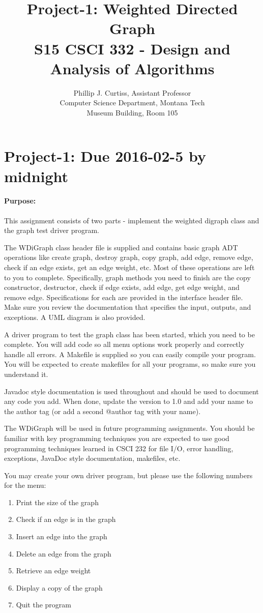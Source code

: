 \documentclass[10pt,letterpaper]{article}
\title{Project-1: Weighted Directed Graph\\
	   S15 CSCI 332 - Design and Analysis of Algorithms}
\author{Phillip J. Curtiss, Assistant Professor\\
	    Computer Science Department, Montana Tech\\
		Museum Building, Room 105}
\newcounter{x}\setcounter{x}{1}
\begin{document}
\pagestyle{fancy}
\maketitle
\thispagestyle{empty}

\section*{Project-1: Due 2016-02-5 by midnight}

\paragraph{Purpose:} This assignment consists of two parts - implement the weighted digraph class and the graph test driver program.

The WDiGraph class header file is supplied and contains basic graph ADT operations like create graph, destroy graph, copy graph, add edge, remove edge, check if an edge exists, get an edge weight, etc.  Most of these operations are left to you to complete. Specifically, graph methods you need to finish are the copy constructor, destructor, check if edge exists, add edge, get edge weight, and remove edge. Specifications for each are provided in the interface header file. Make sure you review the documentation that specifies the input, outputs, and exceptions. A UML diagram is also provided.

A driver program to test the graph class has been started, which you need to be complete. You will add code so all menu options work properly and correctly handle all errors. A Makefile is supplied so you can easily compile your program. You will be expected to create makefiles for all your programs, so make sure you understand it.

Javadoc style documentation is used throughout and should be used to document any code you add. When done, update the version to 1.0 and add your name to the author tag (or add a second @author tag with your name).  

The WDiGraph will be used in future programming assignments. You should be familiar with key programming techniques you are expected to use good programming techniques learned in CSCI 232 for file I/O, error handling, exceptions, JavaDoc style documentation, makefiles, etc.

You may create your own driver program, but please use the following numbers for the menu:

\begin{enumerate}
	\item Print the size of the graph
	\item Check if an edge is in the graph
	\item Insert an edge into the graph
	\item Delete an edge from the graph
	\item Retrieve an edge weight
	\item Display a copy of the graph
	\item Quit the program
\end{enumerate}
\end{document}
